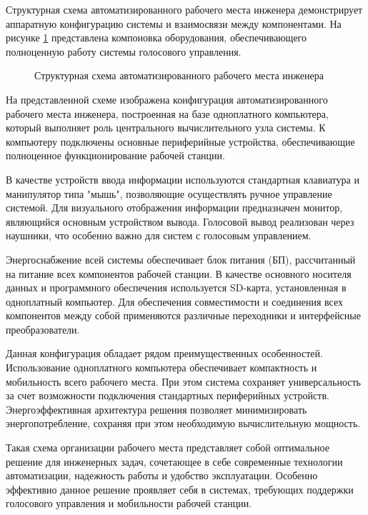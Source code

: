 Структурная схема автоматизированного рабочего места инженера демонстрирует аппаратную конфигурацию системы и взаимосвязи между компонентами. На рисунке \ref{fig:connection_scheme} представлена компоновка оборудования, обеспечивающего полноценную работу системы голосового управления.
\begin{figure}[H]
	\centering
	\caption{Структурная схема автоматизированного рабочего места инженера}
	\label{fig:connection_scheme}
\end{figure}

На представленной схеме изображена конфигурация автоматизированного рабочего места инженера, построенная на базе одноплатного компьютера, который выполняет роль центрального вычислительного узла системы. К компьютеру подключены основные периферийные устройства, обеспечивающие полноценное функционирование рабочей станции.

В качестве устройств ввода информации используются стандартная клавиатура и манипулятор типа "мышь", позволяющие осуществлять ручное управление системой. Для визуального отображения информации предназначен монитор, являющийся основным устройством вывода. Голосовой вывод реализован через наушники, что особенно важно для систем с голосовым управлением.

Энергоснабжение всей системы обеспечивает блок питания (БП), рассчитанный на питание всех компонентов рабочей станции. В качестве основного носителя данных и программного обеспечения используется SD-карта, установленная в одноплатный компьютер. Для обеспечения совместимости и соединения всех компонентов между собой применяются различные переходники и интерфейсные преобразователи.

Данная конфигурация обладает рядом преимущественных особенностей. Использование одноплатного компьютера обеспечивает компактность и мобильность всего рабочего места. При этом система сохраняет универсальность за счет возможности подключения стандартных периферийных устройств. Энергоэффективная архитектура решения позволяет минимизировать энергопотребление, сохраняя при этом необходимую вычислительную мощность.

Такая схема организации рабочего места представляет собой оптимальное решение для инженерных задач, сочетающее в себе современные технологии автоматизации, надежность работы и удобство эксплуатации. Особенно эффективно данное решение проявляет себя в системах, требующих поддержки голосового управления и мобильности рабочей станции.

